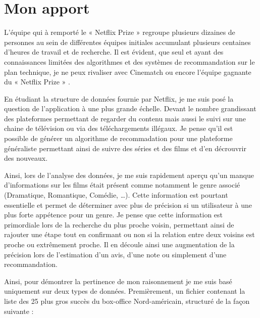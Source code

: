 \chapter{Mon apport}

L'équipe qui à remporté le « Netflix Prize » regroupe plusieurs dizaines de personnes au sein de différentes équipes initiales accumulant plusieurs centaines d’heures de travail et de recherche. Il est évident, que seul et ayant des connaissances limitées des algorithmes et des systèmes de recommandation sur le plan technique, je ne peux rivaliser avec Cinematch ou encore l’équipe gagnante du  « Netflix Prize » . 

\vspace{5mm}

En étudiant la structure de données fournie par Netflix, je me suis posé la question de l’application à une plus grande échelle. Devant le nombre grandissant des plateformes permettant de regarder du contenu mais aussi le suivi sur une chaine de télévision ou via des téléchargements illégaux. Je pense qu’il est possible de générer un algorithme de recommadation pour une plateforme généraliste permettant ainsi de suivre des séries et des films et d'en décrouvrir des nouveaux. 

\vspace{5mm}

Ainsi, lors de l’analyse des données, je me suis rapidement aperçu qu'un manque d’informations sur les films était présent comme notamment le genre associé (Dramatique, Romantique, Comédie, …). Cette information est pourtant essentielle et permet de déterminer avec plus de précision si un utilisateur à une plus forte appétence pour un genre. Je pense que cette information est primordiale lors de la recherche du plus proche voisin, permettant ainsi de rajouter une étape tout en confirmant ou non si la relation entre deux voisins est proche ou extrêmement proche. Il en découle ainsi une augmentation de la précision lors de l'estimation d'un avis, d'une note ou simplement d'une recommandation. 

\vspace{5mm}

Ainsi, pour démontrer la pertinence de mon raisonnement je me suis basé uniquement sur deux types de données. Premièrement, un fichier contenant la liste des 25 plus gros succès du box-office Nord-américain, structuré de la façon suivante : 



\vspace{5mm}

